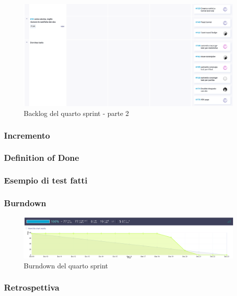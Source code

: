 \documentclass{article}
\begin{document}
\begin{figure}[H]
    \centering
    \includegraphics[width=1\textwidth]{backlog4_2}
    \caption{Backlog del quarto sprint - parte 2}
    \label{fig:backlog4_2}
\end{figure}

\subsubsection{Incremento}

\subsubsection{Definition of Done}

\subsubsection{Esempio di test fatti}

\subsubsection{Burndown}
\begin{figure}[H]
    \centering
    \includegraphics[width=1\textwidth]{burndown4}
    \caption{Burndown del quarto sprint}
    \label{fig:burndown4}
\end{figure}

\subsubsection{Retrospettiva}
\end{document}
